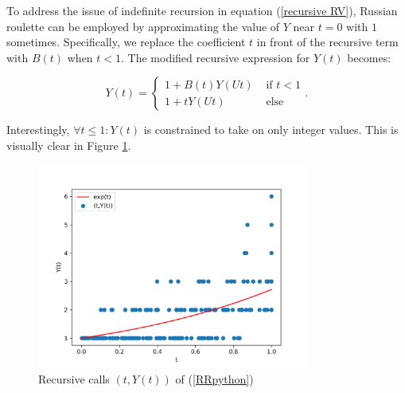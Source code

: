 \documentclass[a4paper,12pt]{article}
\begin{document}
\begin{example} \label{ex: russian roulette}
    To address the issue of indefinite recursion in equation
    (\ref{recursive RV}), Russian roulette can be employed
    by approximating the value of $Y$ near $t = 0$ with $1$
    sometimes. Specifically, we replace the coefficient $t$
    in front of the recursive term with $B(t)$ when $t < 1$.
    The modified recursive expression for $Y(t)$ becomes:

    \begin{equation}
        Y(t) =
        \begin{cases}
            1 + B(t)Y(Ut) & \text{ if } t < 1 \\
            1 + tY(Ut)    & \text{ else}
        \end{cases}.
    \end{equation}
\end{example}

\vspace{0.2cm}

\begin{pythonn} \label{RRpython}
    Interestingly, $\forall t \le 1:Y(t)$ is constrained to take on only integer values.
    This is visually clear in Figure \ref{fig:russian roulette}.
    \begin{figure}[h!]
        \centering
        \includegraphics[width=0.8\textwidth]{plots/russian roulette example.png}
        \caption{Recursive calls $(t,Y(t))$ of (\ref{RRpython}) }
        \label{fig:russian roulette}
    \end{figure}

\end{pythonn}
\end{document}
